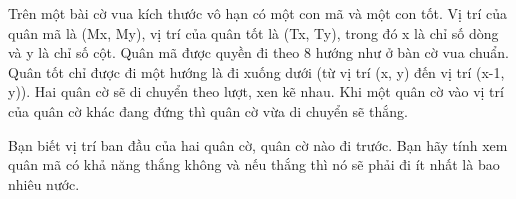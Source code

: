 Trên một bài cờ vua kích thước vô hạn có một con mã và một con tốt. Vị trí của quân mã là (Mx, My), vị trí của quân tốt là (Tx, Ty), trong đó x là chỉ số dòng và y là chỉ số cột. Quân mã được quyền đi theo 8 hướng như ở bàn cờ vua chuẩn. Quân tốt chỉ được đi một hướng là đi xuống dưới (từ vị trí (x, y) đến vị trí (x-1, y)). Hai quân cờ sẽ di chuyển theo lượt, xen kẽ nhau. Khi một quân cờ vào vị trí của quân cờ khác đang đứng thì quân cờ vừa di chuyển sẽ thắng.  

   Bạn biết vị trí ban đầu của hai quân cờ, quân cờ nào đi trước. Bạn hãy tính xem quân mã có khả năng thắng không và nếu thắng thì nó sẽ phải đi ít nhất là bao nhiêu nước.